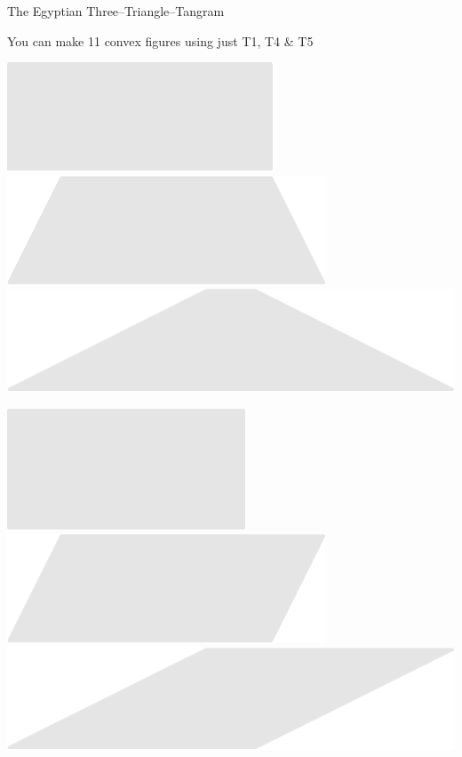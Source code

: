 \documentclass[14pt]{beamer}
\begin{document}
    \begin{frame}{The Egyptian Three--Triangle--Tangram}
        \begin{center}
            You can make 11 convex figures using just T1, T4 \& T5

            \bigskip \bigskip

            \includegraphics[scale=0.39]{figures/figure004b.pdf}\qquad
            \includegraphics[scale=0.39]{figures/figure004e.pdf}\qquad
            \includegraphics[scale=0.39]{figures/figure004f.pdf}\\

            \bigskip\medskip

            \;\;\includegraphics[scale=0.39]{figures/figure004a.pdf}\qquad
            \includegraphics[scale=0.39]{figures/figure004h.pdf}\qquad
            \includegraphics[scale=0.39]{figures/figure004i.pdf}\\


\end{center}
\end{frame}
\end{document}
